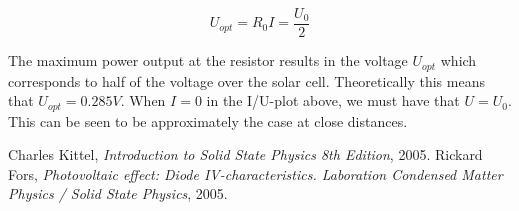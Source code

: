 \documentclass[a4paper,twoside=false,abstract=false,numbers=noenddot,
titlepage=false,headings=small,parskip=half,version=last]{scrartcl}
\begin{document}
\begin{equation}
    U_{opt}=R_0 I=\frac{U_0}{2}
\end{equation}

The maximum power output at the resistor results in the voltage $ U_{opt}$ which corresponds to half of the voltage over the solar cell. Theoretically this means that $U_{opt} = 0.285 V$. When $I=0$ in the I/U-plot above, we must have that $U = U_0$. This can be seen to be approximately the case at close distances.

\begin{thebibliography}{1}
        Charles Kittel,
        {\em Introduction to Solid State Physics 8th Edition},
        2005.
		Rickard Fors,
		{\em Photovoltaic effect: Diode IV-characteristics. Laboration Condensed Matter Physics / Solid State Physics},
		2005.
\end{thebibliography}
\end{document}
